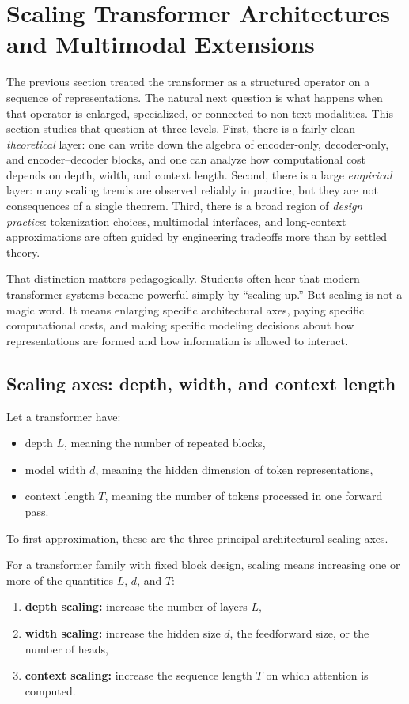 \section{Scaling Transformer Architectures and Multimodal Extensions}

The previous section treated the transformer as a structured operator on a sequence of representations.
The natural next question is what happens when that operator is enlarged, specialized, or connected to non-text modalities.
This section studies that question at three levels.
First, there is a fairly clean \emph{theoretical} layer: one can write down the algebra of encoder-only, decoder-only, and encoder--decoder blocks, and one can analyze how computational cost depends on depth, width, and context length.
Second, there is a large \emph{empirical} layer: many scaling trends are observed reliably in practice, but they are not consequences of a single theorem.
Third, there is a broad region of \emph{design practice}: tokenization choices, multimodal interfaces, and long-context approximations are often guided by engineering tradeoffs more than by settled theory.

\medskip

That distinction matters pedagogically.
Students often hear that modern transformer systems became powerful simply by ``scaling up.''
But scaling is not a magic word.
It means enlarging specific architectural axes, paying specific computational costs, and making specific modeling decisions about how representations are formed and how information is allowed to interact.

\subsection*{Scaling axes: depth, width, and context length}

Let a transformer have:
\begin{itemize}
    \item depth \(L\), meaning the number of repeated blocks,
    \item model width \(d\), meaning the hidden dimension of token representations,
    \item context length \(T\), meaning the number of tokens processed in one forward pass.
\end{itemize}
To first approximation, these are the three principal architectural scaling axes.

\begin{definition}
For a transformer family with fixed block design, scaling means increasing one or more of the quantities \(L\), \(d\), and \(T\):
\begin{enumerate}
    \item \textbf{depth scaling:} increase the number of layers \(L\),
    \item \textbf{width scaling:} increase the hidden size \(d\), the feedforward size, or the number of heads,
    \item \textbf{context scaling:} increase the sequence length \(T\) on which attention is computed.
\end{enumerate}
\end{definition}

